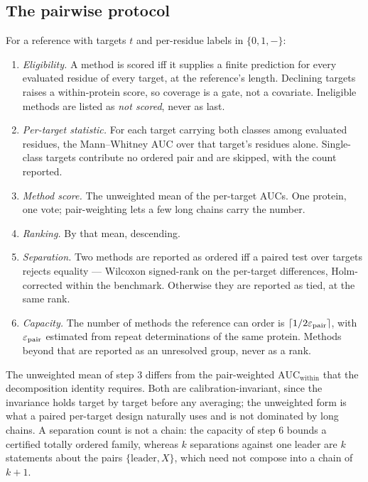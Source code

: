 \subsection*{The pairwise protocol}

For a reference with targets $t$ and per-residue labels in $\{0,1,-\}$:

\begin{enumerate}\itemsep1pt \parskip0pt
\item \emph{Eligibility.} A method is scored iff it supplies a finite
prediction for every evaluated residue of every target, at the reference's
length. Declining targets raises a within-protein score, so coverage is a gate,
not a covariate. Ineligible methods are listed as \emph{not scored}, never as
last.
\item \emph{Per-target statistic.} For each target carrying both classes among
evaluated residues, the Mann--Whitney AUC over that target's residues alone.
Single-class targets contribute no ordered pair and are skipped, with the count
reported.
\item \emph{Method score.} The unweighted mean of the per-target AUCs. One
protein, one vote; pair-weighting lets a few long chains carry the number.
\item \emph{Ranking.} By that mean, descending.
\item \emph{Separation.} Two methods are reported as ordered iff a paired test
over targets rejects equality --- Wilcoxon signed-rank on the per-target
differences, Holm-corrected within the benchmark. Otherwise they are reported as
tied, at the same rank.
\item \emph{Capacity.} The number of methods the reference can order is
$\lceil 1/2\varepsilon_{\text{pair}} \rceil$, with $\varepsilon_{\text{pair}}$ estimated from
repeat determinations of the same protein. Methods beyond that are reported as an
unresolved group, never as a rank.
\end{enumerate}

The unweighted mean of step 3 differs from the pair-weighted
$\mathrm{AUC}_{\text{within}}$ that the decomposition identity requires. Both are
calibration-invariant, since the invariance holds target by target before any
averaging; the unweighted form is what a paired per-target design naturally uses
and is not dominated by long chains. A separation count is not a chain: the
capacity of step 6 bounds a certified totally ordered family, whereas $k$
separations against one leader are $k$ statements about the pairs
$\{\text{leader}, X\}$, which need not compose into a chain of $k{+}1$.

